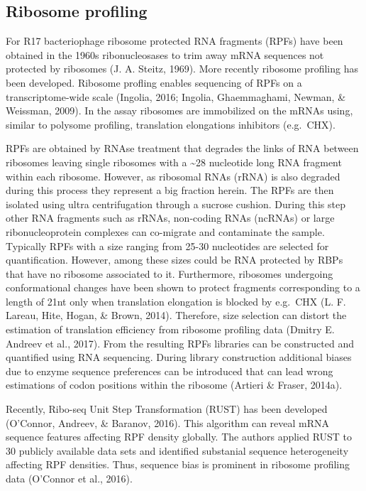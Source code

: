 \documentclass[12pt,openany]{book}
\begin{document}
\subsection{Ribosome profiling} \label{riboseq}

For R17 bacteriophage ribosome protected RNA fragments (RPFs) have been
obtained in the 1960s ribonucleosases to trim away mRNA sequences not
protected by ribosomes (J. A. Steitz, 1969). More recently ribosome
profiling has been developed. Ribosome profling enables sequencing of
RPFs on a transcriptome-wide scale (Ingolia, 2016; Ingolia,
Ghaemmaghami, Newman, \& Weissman, 2009). In the assay ribosomes are
immobilized on the mRNAs using, similar to polysome profiling,
translation elongations inhibitors (e.g.~CHX).

RPFs are obtained by RNAse treatment that degrades the links of RNA
between ribosomes leaving single ribosomes with a \textasciitilde{}28
nucleotide long RNA fragment within each ribosome. However, as ribosomal
RNAs (rRNA) is also degraded during this process they represent a big
fraction herein. The RPFs are then isolated using ultra centrifugation
through a sucrose cushion. During this step other RNA fragments such as
rRNAs, non-coding RNAs (ncRNAs) or large ribonucleoprotein complexes can
co-migrate and contaminate the sample. Typically RPFs with a size
ranging from 25-30 nucleotides are selected for quantification. However,
among these sizes could be RNA protected by RBPs that have no ribosome
associated to it. Furthermore, ribosomes undergoing conformational
changes have been shown to protect fragments corresponding to a length
of 21nt only when translation elongation is blocked by e.g.~CHX (L. F.
Lareau, Hite, Hogan, \& Brown, 2014). Therefore, size selection can
distort the estimation of translation efficiency from ribosome profiling
data (Dmitry E. Andreev et al., 2017). From the resulting RPFs libraries
can be constructed and quantified using RNA sequencing. During library
construction additional biases due to enzyme sequence preferences can be
introduced that can lead wrong estimations of codon positions within the
ribosome (Artieri \& Fraser, 2014a).

Recently, Ribo-seq Unit Step Transformation (RUST) has been developed
(O'Connor, Andreev, \& Baranov, 2016). This algorithm can reveal mRNA
sequence features affecting RPF density globally. The authors applied
RUST to 30 publicly available data sets and identified substanial
sequence heterogeneity affecting RPF densities. Thus, sequence bias is
prominent in ribosome profiling data (O'Connor et al., 2016).
\end{document}
